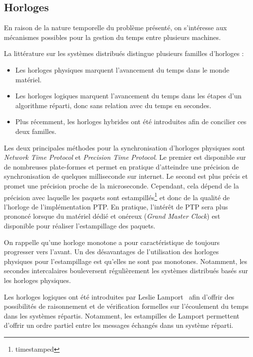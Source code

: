 \documentclass[10pt]{article}
\begin{document}

\subsection{Horloges}
En raison de la nature temporelle du problème présenté, on s'intéresse aux mécanismes possibles pour la gestion du temps entre plusieurs machines.

La littérature sur les systèmes distribués distingue plusieurs familles d'horloges : 
\begin{itemize}
    \item Les horloges physiques marquent l'avancement du temps dans le monde matériel.
    \item Les horloges logiques marquent l'avancement du temps dans les étapes d'un algorithme réparti, donc sans relation avec du temps en secondes.
    \item Plus récemment, les horloges hybrides ont été introduites afin de concilier ces deux familles.
\end{itemize}

Les deux principales méthodes pour la synchronisation d'horloges physiques sont \emph{Network Time Protocol}\cite{mills1991internet} et \emph{Precision Time Protocol}\cite{peng2009research}. 
Le premier est disponible sur de nombreuses plate-formes et permet en pratique d'atteindre une précision de synchronisation de quelques milliseconde sur internet. 
Le second est plus précis et promet une précision proche de la microseconde. 
Cependant, cela dépend de la précision avec laquelle les paquets sont estampillés\footnote{timestamped} et donc de la qualité de l'horloge de l'implémentation PTP. 
En pratique, l'intérêt de PTP sera plus prononcé lorsque du matériel dédié et onéreux (\emph{Grand Master Clock}) est disponible pour réaliser l'estampillage des paquets.

On rappelle qu'une horloge monotone a pour caractéristique de toujours progresser vers l'avant. 
Un des désavantages de l'utilisation des horloges physiques pour l'estampillage est qu'elles ne sont pas monotones. 
Notamment, les secondes intercalaires bouleversent régulièrement les systèmes distribués basés sur les horloges physiques.

Les horloges logiques ont été introduites par Leslie Lamport~\cite{lamport1978time} afin d'offrir des possibilités de raisonnement et de vérification formelles sur l'écoulement du temps dans les systèmes répartis.
Notamment, les estampilles de Lamport permettent d'offrir un ordre partiel entre les messages échangés dans un système réparti.
\end{document}
